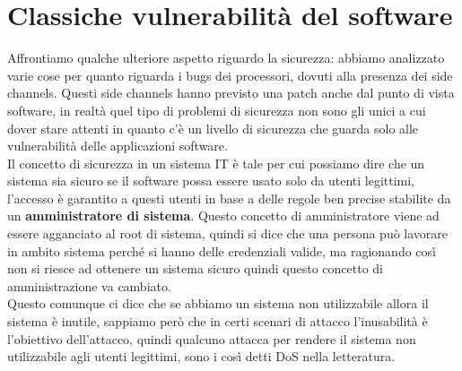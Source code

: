 \documentclass[12pt, oneside]{extbook}
\begin{document}
\section{Classiche vulnerabilità del software}
Affrontiamo qualche ulteriore aspetto riguardo la sicurezza: abbiamo analizzato varie cose per quanto riguarda i bugs dei processori, dovuti alla presenza dei side channels. Questi side channels hanno previsto una patch anche dal punto di vista software, in realtà quel tipo di problemi di sicurezza non sono gli unici a cui dover stare attenti in quanto c'è un livello di sicurezza che guarda solo alle vulnerabilità delle applicazioni software.\\Il concetto di sicurezza in un sistema IT è tale per cui possiamo dire che un sistema sia sicuro se il software possa essere usato solo da utenti legittimi, l'accesso è garantito a questi utenti in base a delle regole ben precise stabilite da un \textbf{amministratore di sistema}. Questo concetto di amministratore viene ad essere agganciato al root di sistema, quindi si dice che una persona può lavorare in ambito sistema perché si hanno delle credenziali valide, ma ragionando così non si riesce ad ottenere un sistema sicuro quindi questo concetto di amministrazione va cambiato.\\Questo comunque ci dice che se abbiamo un sistema non utilizzabile allora il sistema è inutile, sappiamo però che in certi scenari di attacco l'inusabilità è l'obiettivo dell'attacco, quindi qualcuno attacca per rendere il sistema non utilizzabile agli utenti legittimi, sono i così detti DoS nella letteratura.
\end{document}
